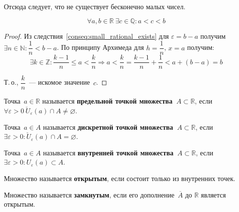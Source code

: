 Отсюда следует, что не существует бесконечно малых чисел.

\begin{consequent}
\begin{equation*}
\forall a, b \in \mathbb R \ \exists c \in \mathbb Q \colon a < c < b
\end{equation*}
\end{consequent}
\begin{proof}
Из следствия~\ref*{conseq:small_rational_exists} для $\varepsilon = b - a$ получим $\exists n \in \mathbb N \colon \dfrac1n < b - a$.
По принципу Архимеда для $h = \dfrac1n$, $x = a$ получим:
\begin{equation*}
\exists k \in \mathbb Z \colon \frac{k - 1}n \leqslant a < \frac{k}n \Rightarrow
a < \frac{k}n = \frac{k - 1}n + \frac1n < a + (b - a) = b
\end{equation*}

Т.\,о., $\dfrac{k}n$~--- искомое значение~$c$.
\end{proof}

 Точка~$a \in \mathbb R$ называется \textbf{предельной точкой множества~$A \subset \mathbb R$}, если
$\forall \varepsilon > 0 \ \breve U_\varepsilon(a) \cap A \neq \varnothing$.

 Точка~$a \in A$ называется \textbf{дискретной точкой множества~$A \subset \mathbb R$}, если
$\exists \varepsilon > 0 \colon \breve U_\varepsilon(a) \cap A = \varnothing$.

 Точка~$a \in A$ называется \textbf{внутренней точкой множества~$A \subset \mathbb R$}, если
$\exists \varepsilon > 0 \colon U_\varepsilon(a) \subset A$.

Множество называется \textbf{открытым}, если состоит только из внутренних точек.

Множество называется \textbf{замкнутым}, если его дополнение~$\overline A$ до $\mathbb R$ является открытым.


